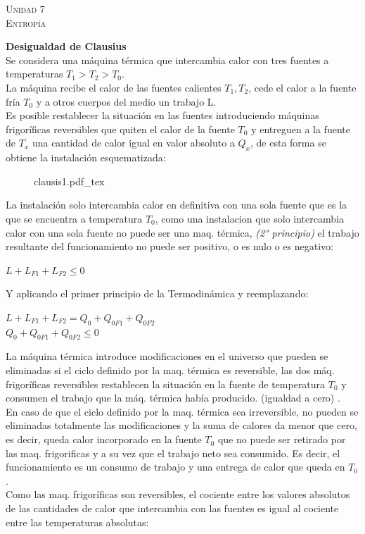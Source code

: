 \documentclass[11pt,a4paper,twocolumn]{article}
\newcommand{\unidad}[2]{\begin{center}
		\fontsize{10}{10}\selectfont\color{gray!50!black}\scshape Unidad #1 \\
		\fontsize{14}{14}\selectfont \scshape #2
\end{center}}
\begin{document}
	\unidad{7}{Entropía}
	\textbf{Desigualdad de Clausius}\\
	Se considera una máquina térmica que intercambia calor con tres fuentes a temperaturas $T_{1}> T_{2}> T_{0}$.\\
	La máquina recibe el calor de las fuentes calientes $T_{1},T_{2}$, cede el calor a la fuente fría $T_{0}$ y a otros cuerpos del medio un trabajo L.\\
	Es posible restablecer la situación en las fuentes introduciendo máquinas frigoríficas reversibles que quiten el calor de la fuente $T_{0}$ y entreguen a la fuente de $T_{x}$ una cantidad de calor igual en valor absoluto a $Q_{x}$, de esta forma se obtiene la instalación esquematizada:
	\begin{figure}[ht]
		\centering
		\def\svgwidth{0.3\textwidth}
		{clausis1.pdf_tex}
	\end{figure}
	
	
	La instalación solo intercambia calor en definitiva con una sola fuente que es la que se encuentra a temperatura $T_{0}$, como una instalacion que solo intercambia calor con una sola fuente no puede ser una maq. térmica, \emph{(2° principio)} el trabajo resultante del funcionamiento no puede ser positivo, o es nulo o es negativo:
	\begin{center}
		$L+L_{F1}+L_{F2}\leq0 $
	\end{center}
	Y aplicando el primer principio de la Termodinámica y reemplazando:
	\begin{center}
		$L+L_{F1}+L_{F2}=Q_{0}+Q_{0F1}+Q_{0F2}$\\
		\vspace{0.1 cm}
		$Q_{0}+Q_{0F1}+Q_{0F2}\leq0$
	\end{center}
	La máquina térmica introduce modificaciones en el universo que pueden se eliminadas si el ciclo definido por la maq. térmica es reversible, las dos máq. frigoríficas reversibles restablecen la situación en la fuente de temperatura $T_{0}$ y consumen el trabajo que la máq. térmica había producido. (igualdad a cero) .\\
	En caso de que el ciclo definido por la maq. térmica sea irreversible, no pueden se eliminadas totalmente las modificaciones y la suma de calores da menor que cero, es decir, queda calor incorporado en la fuente $T_{0}$ que no puede ser retirado por las maq. frigorificas y a su vez que el trabajo neto sea consumido. Es decir, el funcionamiento es un consumo de trabajo y una entrega de calor que queda en $T_{0}$.\\
	Como las maq. frigoríficas son reversibles, el cociente entre los valores absolutos de las cantidades de calor que intercambia con las fuentes es igual al cociente entre las temperaturas absolutas:\\
\end{document}
